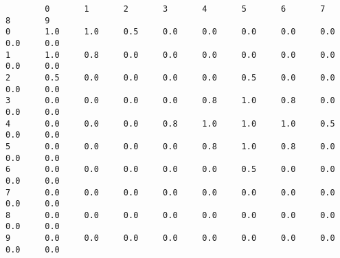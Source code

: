 \begin{enumerate}
\begin{lstlisting}
        0       1       2       3       4       5       6       7       8       9
0       1.0     1.0     0.5     0.0     0.0     0.0     0.0     0.0     0.0     0.0     
1       1.0     0.8     0.0     0.0     0.0     0.0     0.0     0.0     0.0     0.0
2       0.5     0.0     0.0     0.0     0.0     0.5     0.0     0.0     0.0     0.0
3       0.0     0.0     0.0     0.0     0.8     1.0     0.8     0.0     0.0     0.0
4       0.0     0.0     0.0     0.8     1.0     1.0     1.0     0.5     0.0     0.0
5       0.0     0.0     0.0     0.0     0.8     1.0     0.8     0.0     0.0     0.0
6       0.0     0.0     0.0     0.0     0.0     0.5     0.0     0.0     0.0     0.0
7       0.0     0.0     0.0     0.0     0.0     0.0     0.0     0.0     0.0     0.0
8       0.0     0.0     0.0     0.0     0.0     0.0     0.0     0.0     0.0     0.0
9       0.0     0.0     0.0     0.0     0.0     0.0     0.0     0.0     0.0     0.0
\end{lstlisting}
\end{enumerate}

